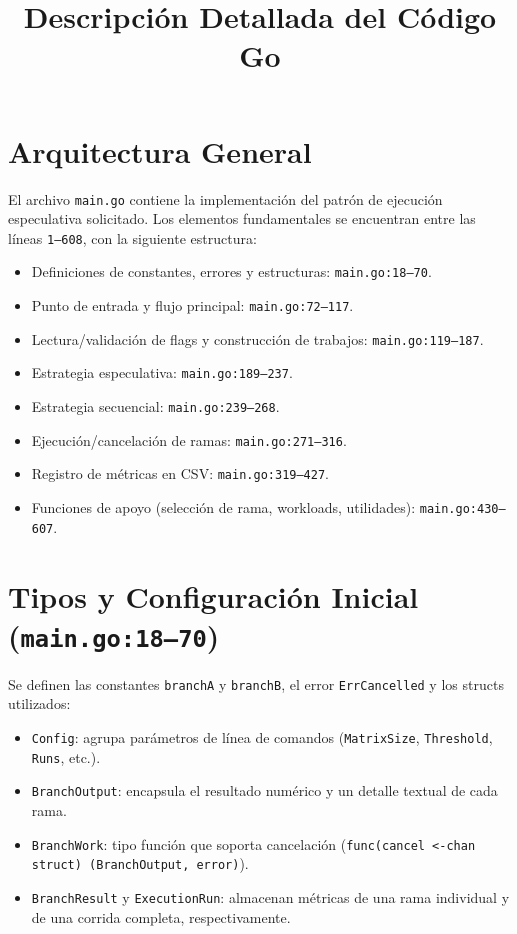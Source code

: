 \documentclass[11pt]{article}
\title{Descripción Detallada del Código Go}
\author{}
\date{}
\begin{document}
\maketitle

\section{Arquitectura General}
El archivo \texttt{main.go} contiene la implementación del patrón de ejecución especulativa solicitado. Los elementos fundamentales se encuentran entre las líneas \texttt{1--608}, con la siguiente estructura:
\begin{itemize}
  \item Definiciones de constantes, errores y estructuras: \texttt{main.go:18--70}.
  \item Punto de entrada y flujo principal: \texttt{main.go:72--117}.
  \item Lectura/validación de flags y construcción de trabajos: \texttt{main.go:119--187}.
  \item Estrategia especulativa: \texttt{main.go:189--237}.
  \item Estrategia secuencial: \texttt{main.go:239--268}.
  \item Ejecución/cancelación de ramas: \texttt{main.go:271--316}.
  \item Registro de métricas en CSV: \texttt{main.go:319--427}.
  \item Funciones de apoyo (selección de rama, workloads, utilidades): \texttt{main.go:430--607}.
\end{itemize}

\section{Tipos y Configuración Inicial (\texttt{main.go:18--70})}
Se definen las constantes \texttt{branchA} y \texttt{branchB}, el error \texttt{ErrCancelled} y los structs utilizados:
\begin{itemize}
  \item \texttt{Config}: agrupa parámetros de línea de comandos (\texttt{MatrixSize}, \texttt{Threshold}, \texttt{Runs}, etc.).
  \item \texttt{BranchOutput}: encapsula el resultado numérico y un detalle textual de cada rama.
  \item \texttt{BranchWork}: tipo función que soporta cancelación (\texttt{func(cancel <-chan struct{}) (BranchOutput, error)}).
  \item \texttt{BranchResult} y \texttt{ExecutionRun}: almacenan métricas de una rama individual y de una corrida completa, respectivamente.
\end{itemize}
\end{document}
